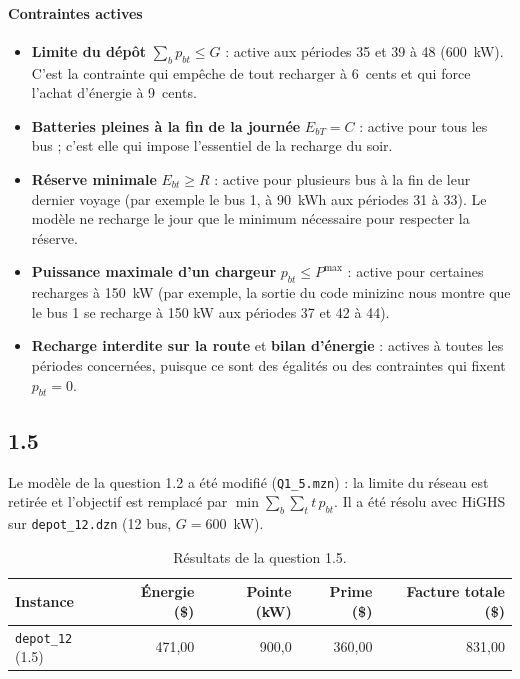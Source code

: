 \documentclass{article}
\begin{document}
\paragraph{Contraintes actives}
\begin{itemize}
  \item \textbf{Limite du dépôt} $\sum_b p_{bt} \le G$ : active aux périodes 35 et 39 à 48 (600~kW). C'est la contrainte qui empêche de tout recharger à 6~cents et qui force l'achat d'énergie à 9~cents.
  \item \textbf{Batteries pleines à la fin de la journée} $E_{bT} = C$ : active pour tous les bus ; c'est elle qui impose l'essentiel de la recharge du soir.
  \item \textbf{Réserve minimale} $E_{bt} \ge R$ : active pour plusieurs bus à la fin de leur dernier voyage (par exemple le bus 1, à 90~kWh aux périodes 31 à 33). Le modèle ne recharge le jour que le minimum nécessaire pour respecter la réserve.
  \item \textbf{Puissance maximale d'un chargeur} $p_{bt} \le P^{\max}$ : active pour certaines recharges à 150~kW (par exemple, la sortie du code minizinc nous montre que le bus 1 se recharge à 150 kW aux périodes 37 et 42 à 44).
  \item \textbf{Recharge interdite sur la route} et \textbf{bilan d'énergie} : actives à toutes les périodes concernées, puisque ce sont des égalités ou des contraintes qui fixent $p_{bt} = 0$.
\end{itemize}

\subsection*{1.5}
Le modèle de la question 1.2 a été modifié (\texttt{Q1\_5.mzn}) : la limite du réseau est retirée et l'objectif est remplacé par $\min \sum_{b}\sum_{t} t\,p_{bt}$. Il a été résolu avec HiGHS sur \texttt{depot\_12.dzn} (12 bus, $G = 600$~kW).

\begin{table}[H]
  \centering
  \begin{tabular}{|l|r|r|r|r|}
    \hline
    \rowcolor{gray!15}
    Instance & Énergie (\$) & Pointe (kW) & Prime (\$) & Facture totale (\$) \\
    \hline
    \texttt{depot\_12} (1.5) & 471{,}00 & 900{,}0 & 360{,}00 & 831{,}00 \\
    \hline
  \end{tabular}
  \caption{Résultats de la question 1.5.}
  \label{tab:q15}
\end{table}
\end{document}
